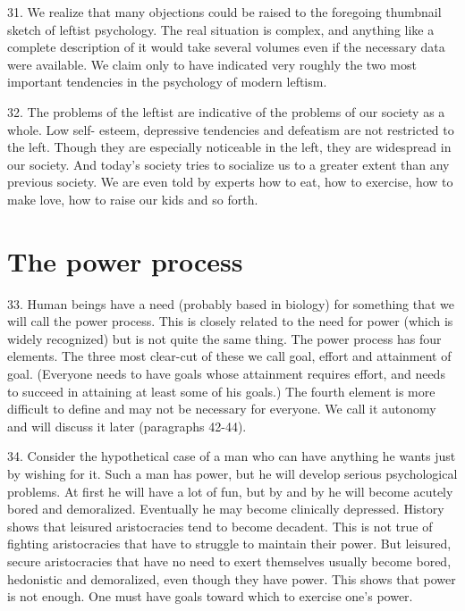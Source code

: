 \documentclass{article}
\begin{document}
31.  We realize that many objections could be raised to the foregoing thumbnail sketch of leftist 
psychology.  The real situation is complex, and anything like a complete description of it would 
take several volumes even if the necessary data were available.  We claim only to have indicated 
very roughly the two most important tendencies in the psychology of modern leftism. \vspace{\baselineskip}

32.  The problems of the leftist are indicative of the problems of our society as a whole.  Low self-
esteem,  depressive  tendencies  and  defeatism  are  not  restricted  to  the  left.   Though  they  are  
especially noticeable in the left, they are widespread in our society.  And today’s society tries to 
socialize us to a greater extent than any previous society.  We are even told by experts how to eat, 
how to exercise, how to make love, how to raise our kids and so forth. 


\section{The power process}

\hspace{0.5cm} 33.  Human  beings  have  a  need  (probably  based  in  biology)  for  something  that  we  will  call  
the power process. This is closely related to the need for power (which is widely recognized) but 
is  not  quite  the  same  thing.   The  power  process  has  four  elements.   The  three  most  clear-cut  of  
these we call goal, effort and attainment of goal.  (Everyone needs to have goals whose attainment 
requires effort, and needs to succeed in attaining at least some of his goals.) The fourth element is 
more  difficult  to  define  and  may  not  be  necessary  for  everyone.   We  call  it  autonomy  and  will  
discuss it later (paragraphs 42-44). \vspace{\baselineskip}

34.  Consider the hypothetical case of a man who can have anything he wants just by wishing for 
it.  Such a man has power, but he will develop serious psychological problems.  At first he will 
have a lot of fun, but by and by he will become acutely bored and demoralized.  Eventually he may 
become clinically depressed.  History shows that leisured aristocracies tend to become 
decadent.   This  is  not  true  of  fighting  aristocracies  that  have  to  struggle  to  maintain  their  
power.  But leisured, secure aristocracies that have no need to exert themselves usually become 
bored, hedonistic and demoralized, even though they have power.  This shows that power is not 
enough.  One must have goals toward which to exercise one’s power. \vspace{\baselineskip}
\end{document}
